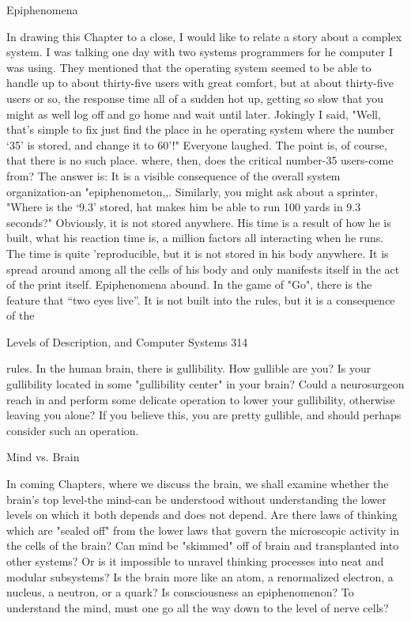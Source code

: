                                          Epiphenomena

       In drawing this Chapter to a close, I would like to relate a story about a complex
       system. I was talking one day with two systems programmers for he computer I
       was using. They mentioned that the operating system seemed to be able to handle
       up to about thirty-five users with great comfort, but at about thirty-five users or
       so, the response time all of a sudden hot up, getting so slow that you might as well
       log off and go home and wait until later. Jokingly I said, "Well, that's simple to fix
       just find the place in he operating system where the number `35' is stored, and
       change it to 60'!" Everyone laughed. The point is, of course, that there is no such
       place. where, then, does the critical number-35 users-come from? The answer is:
       It is a visible consequence of the overall system organization-an
       "epiphenometon,,.
               Similarly, you might ask about a sprinter, "Where is the `9.3' stored, hat
       makes him be able to run 100 yards in 9.3 seconds?" Obviously, it is not stored
       anywhere. His time is a result of how he is built, what his reaction time is, a
       million factors all interacting when he runs. The time is quite 'reproducible, but it
       is not stored in his body anywhere. It is spread around among all the cells of his
       body and only manifests itself in the act of the print itself.
               Epiphenomena abound. In the game of "Go", there is the feature that “two
       eyes live”. It is not built into the rules, but it is a consequence of the




Levels of Description, and Computer Systems                                              314

       rules. In the human brain, there is gullibility. How gullible are you? Is your
       gullibility located in some "gullibility center" in your brain? Could a
       neurosurgeon reach in and perform some delicate operation to lower your
       gullibility, otherwise leaving you alone? If you believe this, you are pretty
       gullible, and should perhaps consider such an operation.

                                         Mind vs. Brain

       In coming Chapters, where we discuss the brain, we shall examine whether the
       brain's top level-the mind-can be understood without understanding the lower
       levels on which it both depends and does not depend. Are there laws of thinking
       which are "sealed off" from the lower laws that govern the microscopic activity in
       the cells of the brain? Can mind be "skimmed" off of brain and transplanted into
       other systems? Or is it impossible to unravel thinking processes into neat and
       modular subsystems? Is the brain more like an atom, a renormalized electron, a
       nucleus, a neutron, or a quark? Is consciousness an epiphenomenon? To
       understand the mind, must one go all the way down to the level of nerve cells?




